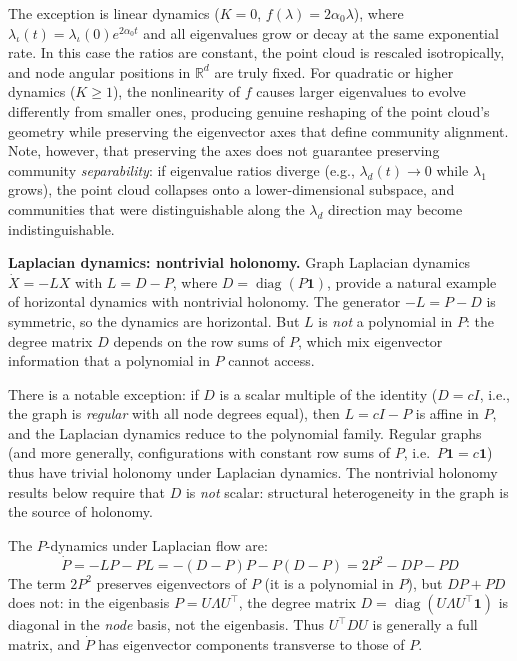 \documentclass{article}
\newcommand{\RR}{\mathbb{R}}
\DeclareMathOperator{\diag}{diag}
\theoremstyle{plain}
\theoremstyle{definition}
\theoremstyle{remark}
\begin{document}
The exception is linear dynamics ($K = 0$, $f(\lambda) = 2 \alpha_0 \lambda$), where $\lambda_\iota(t) = \lambda_\iota(0) e^{2 \alpha_0 t}$ and all eigenvalues grow or decay at the same exponential rate.
In this case the ratios are constant, the point cloud is rescaled isotropically, and node angular positions in $\RR^d$ are truly fixed.
For quadratic or higher dynamics ($K \ge 1$), the nonlinearity of $f$ causes larger eigenvalues to evolve differently from smaller ones, producing genuine reshaping of the point cloud's geometry while preserving the eigenvector axes that define community alignment.
Note, however, that preserving the axes does not guarantee preserving community \emph{separability}: if eigenvalue ratios diverge (e.g., $\lambda_d(t) \to 0$ while $\lambda_1$ grows), the point cloud collapses onto a lower-dimensional subspace, and communities that were distinguishable along the $\lambda_d$ direction may become indistinguishable.

\textbf{Laplacian dynamics: nontrivial holonomy.}
Graph Laplacian dynamics $\dot{X} = -LX$ with $L = D - P$, where $D = \diag(P\mathbf{1})$, provide a natural example of horizontal dynamics with nontrivial holonomy.
The generator $-L = P - D$ is symmetric, so the dynamics are horizontal.
But $L$ is \emph{not} a polynomial in $P$: the degree matrix $D$ depends on the row sums of $P$, which mix eigenvector information that a polynomial in $P$ cannot access.

There is a notable exception: if $D$ is a scalar multiple of the identity ($D = cI$, i.e., the graph is \emph{regular} with all node degrees equal), then $L = cI - P$ is affine in $P$, and the Laplacian dynamics reduce to the polynomial family.
Regular graphs (and more generally, configurations with constant row sums of $P$, i.e.\ $P\mathbf{1} = c\mathbf{1}$) thus have trivial holonomy under Laplacian dynamics.
The nontrivial holonomy results below require that $D$ is \emph{not} scalar: structural heterogeneity in the graph is the source of holonomy.

The $P$-dynamics under Laplacian flow are:
\begin{equation}
\dot{P} = -LP - PL = -(D - P)P - P(D - P) = 2P^2 - DP - PD
\end{equation}
The term $2P^2$ preserves eigenvectors of $P$ (it is a polynomial in $P$), but $DP + PD$ does not: in the eigenbasis $P = U \Lambda U^\top$, the degree matrix $D = \diag(U \Lambda U^\top \mathbf{1})$ is diagonal in the \emph{node} basis, not the eigenbasis.
Thus $U^\top D U$ is generally a full matrix, and $\dot{P}$ has eigenvector components transverse to those of $P$.
\end{document}
